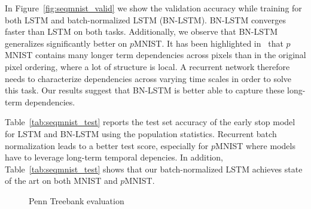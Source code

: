 \documentclass{article} %
\begin{document}
In Figure~\ref{fig:seqmnist_valid} we show the validation accuracy while training for both LSTM and batch-normalized LSTM (BN-LSTM).
BN-LSTM converges faster than LSTM on both tasks.
Additionally, we observe that BN-LSTM generalizes significantly better on $p$MNIST.
It has been highlighted in~\cite{urnn} that
$p$MNIST contains many longer term dependencies across pixels than in
the original pixel ordering, where a lot of structure is local.
A recurrent network therefore needs to characterize dependencies across varying time scales in order to solve this task.
Our results suggest that BN-LSTM is better able to capture these long-term dependencies.

Table~\ref{tab:seqmnist_test} reports the test set accuracy of the early stop model for LSTM and BN-LSTM using the population statistics.
Recurrent batch normalization leads to a better test score, especially for $p$MNIST where models have to leverage long-term temporal depencies.
In addition, Table~\ref{tab:seqmnist_test} shows that our batch-normalized LSTM achieves state of the art on both MNIST and $p$MNIST.

\begin{figure}[!ht]
  \center%
  \hspace{2mm}%
  \caption{Penn Treebank evaluation}
  \label{fig:ptb}
\end{figure}
\end{document}
